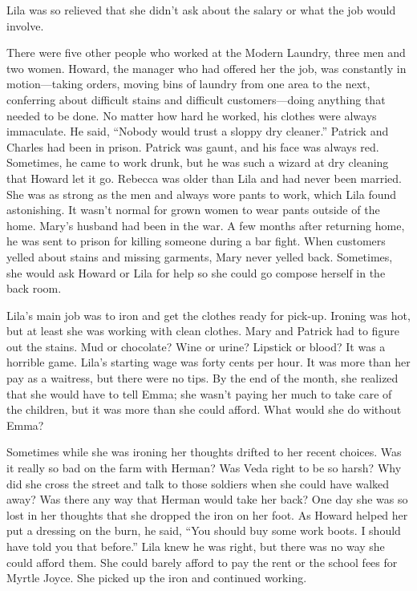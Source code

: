 \documentclass[
  american,
  letterpaper,
]{book}
\begin{document}
Lila was so relieved that she didn't ask about the salary or what the
job would involve.

There were five other people who worked at the Modern Laundry, three men
and two women. Howard, the manager who had offered her the job, was
constantly in motion---taking orders, moving bins of laundry from one
area to the next, conferring about difficult stains and difficult
customers---doing anything that needed to be done. No matter how hard he
worked, his clothes were always immaculate. He said, ``Nobody would
trust a sloppy dry cleaner.'' Patrick and Charles had been in prison.
Patrick was gaunt, and his face was always red. Sometimes, he came to
work drunk, but he was such a wizard at dry cleaning that Howard let it
go. Rebecca was older than Lila and had never been married. She was as
strong as the men and always wore pants to work, which Lila found
astonishing. It wasn't normal for grown women to wear pants outside of
the home. Mary's husband had been in the war. A few months after
returning home, he was sent to prison for killing someone during a bar
fight. When customers yelled about stains and missing garments, Mary
never yelled back. Sometimes, she would ask Howard or Lila for help so
she could go compose herself in the back room.

Lila's main job was to iron and get the clothes ready for pick-up.
Ironing was hot, but at least she was working with clean clothes. Mary
and Patrick had to figure out the stains. Mud or chocolate? Wine or
urine? Lipstick or blood? It was a horrible game. Lila's starting wage
was forty cents per hour. It was more than her pay as a waitress, but
there were no tips. By the end of the month, she realized that she would
have to tell Emma; she wasn't paying her much to take care of the
children, but it was more than she could afford. What would she do
without Emma?

Sometimes while she was ironing her thoughts drifted to her recent
choices. Was it really so bad on the farm with Herman? Was Veda right to
be so harsh? Why did she cross the street and talk to those soldiers
when she could have walked away? Was there any way that Herman would
take her back? One day she was so lost in her thoughts that she dropped
the iron on her foot. As Howard helped her put a dressing on the burn,
he said, ``You should buy some work boots. I should have told you that
before.'' Lila knew he was right, but there was no way she could afford
them. She could barely afford to pay the rent or the school fees for
Myrtle Joyce. She picked up the iron and continued working.
\end{document}
